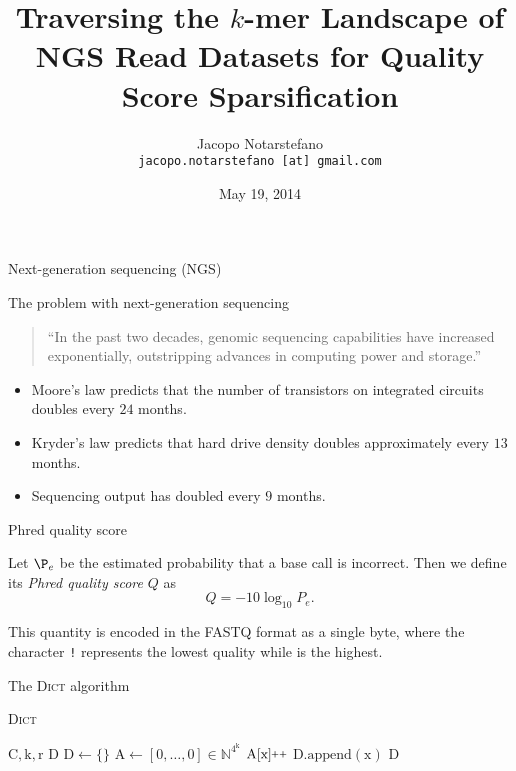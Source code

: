 \documentclass[12pt]{beamer}
\title{Traversing the \(k\)-mer Landscape of NGS Read Datasets for Quality Score Sparsification}
\author[Jacopo Notarstefano]{
    Jacopo Notarstefano\\
    \texttt{jacopo.notarstefano [at] gmail.com}
}
\date{May 19, 2014}
\newcommand{\pp}{\nolinebreak\hspace{-.05em}\raisebox{.4ex}{\tiny\bf +}\nolinebreak\raisebox{.4ex}{\tiny\bf +}}
\newcommand{\textapprox}{\raisebox{0.5ex}{\texttildelow}}
\begin{document}
    \begin{frame}[plain]
        \titlepage
    \end{frame}

    \begin{frame}{Next-generation sequencing (NGS)}
    \end{frame}

    \begin{frame}{The problem with next-generation sequencing}
        \begin{quotation}
            ``In the past two decades, genomic sequencing capabilities have
	    increased exponentially, outstripping advances in computing power
	    and storage.''
        \end{quotation}
        \vspace{0.5cm}
        \begin{itemize}
            \item Moore's law predicts that the number of transistors on
                integrated circuits doubles every \(24\) months.
            \item Kryder's law predicts that hard drive density doubles
                approximately every \(13\) months.
	    \item Sequencing output has doubled every \(9\) months.
        \end{itemize}
    \end{frame}

    \begin{frame}{Phred quality score}
        \begin{definition}
            Let \(\P_e\) be the estimated probability that a base call is
	    incorrect. Then we define its \emph{Phred quality score} \(Q\) as
            \[
                Q = -10\log_{10}{P_e}\text{.}
	    \]
        \end{definition}
	\vspace{0.5cm}
	This quantity is encoded in the FASTQ format as a single byte, where the
	character \texttt{\textquotesingle!\textquotesingle} represents the
	lowest quality while \texttt{\textquotesingle\textapprox\textquotesingle}
	is the highest.
    \end{frame}

    \begin{frame}{The \textsc{Dict} algorithm}
        \begin{algorithm}[H]
	    \caption{\textsc{Dict}}
	    \begin{algorithmic}[1]
                \REQUIRE \(\text{C}, \text{k}, \text{r}\)
		\ENSURE \(\text{D}\)
		\STATE \(\text{D} \leftarrow \{\}\)
		\STATE \(\text{A} \leftarrow [0,\dots,0] \in \mathbb{N}^{4^\text{k}}\)
		    \STATE \(\text{A}[\text{x}]\pp\)
		\ENDFOR
		        \STATE \(\text{D}.\text{append}(\text{x})\)
		    \ENDIF
		\ENDFOR
		\RETURN \(\text{D}\)
	    \end{algorithmic}
	\end{algorithm}
    \end{frame}
\end{document}

